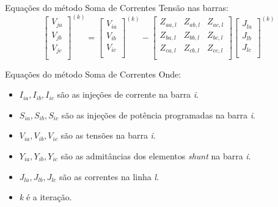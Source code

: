 \documentclass[10pt]{beamer}
\begin{document}
\begin{frame}{Equações do método Soma de Correntes}
        Tensão nas barras:
        \begin{equation}
        \label{equ:shirmV}
        \left[ \begin{matrix}
        V_{ja} \\
        V_{jb} \\
        V_{jc} \\
        \end{matrix} \right]^{(k)}  =
        \left[ \begin{matrix}
        V_{ia} \\
        V_{ib} \\
        V_{ic} \\
        \end{matrix} \right]^{(k)} -
        \left[ \begin{matrix}
        Z_{aa,l} & Z_{ab,l} &  Z_{ac,l} \\
        Z_{ba,l} & Z_{bb,l} &  Z_{bc,l} \\
        Z_{ca,l} & Z_{cb,l} &  Z_{cc,l} \\
        \end{matrix} \right]
        \left[ \begin{matrix}
        J_{la} \\
        J_{lb} \\
        J_{lc} \\
        \end{matrix} \right]^{(k)}
        \end{equation}
\end{frame}

\begin{frame}{Equações do método Soma de Correntes}
 Onde:
 
    \begin{itemize}
    \item $I_{ia}, I_{ib}, I_{ic}$ são as injeções de corrente na barra \emph{i}.
    
    \item $S_{ia}, S_{ib}, S_{ic}$ são as injeções de potência programadas na barra \emph{i}.
    
    \item $V_{ia}, V_{ib}, V_{ic}$ são as tensões na barra \emph{i}.
    
    \item $Y_{ia}, Y_{ib}, Y_{ic}$ são as admitâncias dos elementos \textit{shunt} na barra \emph{i}.
    
    \item $J_{la}, J_{lb}, J_{lc}$ são as correntes na linha \emph{l}.
    
    \item \emph{k} é a iteração.
    \end{itemize}
    
    
\end{frame}
\end{document}

